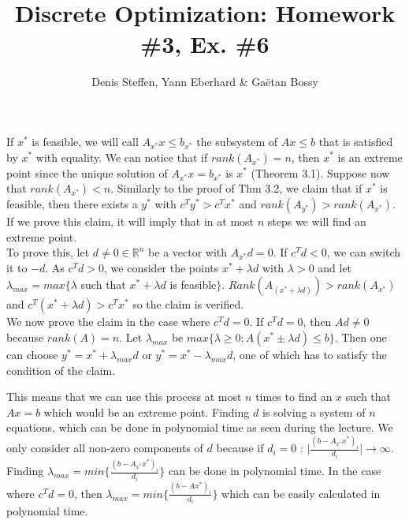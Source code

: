 \documentclass[a4paper,11pt,french]{article}
\title{Discrete Optimization: Homework \#3, Ex. \#6}
\author{Denis Steffen, Yann Eberhard \& Gaëtan Bossy}
\begin{document}
\maketitle
If $x^*$ is feasible, we will call $A_{x^*}x\leq b_{x^*}$ the subsystem of $Ax\leq b$ that is satisfied by $x^*$ with equality. 
We can notice that if $rank(A_{x^*}) = n$, then $x^*$ is an extreme point since the unique solution of $A_{x^*}x = b_{x^*}$ is $x^*$ (Theorem 3.1).
Suppose now that $rank(A_{x^*}) < n$. Similarly to the proof of Thm 3.2, we claim that if $x^*$ is feasible, then there exists a $y^*$ with $c^T y^* > c^T x^*$ and $rank(A_{y^*}) > rank(A_{x^*})$. If we prove this claim, it will imply that in at most $n$ steps we will find an extreme point.\\
To prove this, let $d \not= 0 \in \mathbb{R}^n$ be a vector with $A_{x^*}d = 0$. If $c^T d < 0$, we can switch it to $-d$. As $c^T d > 0$, we consider the points $x^* + \lambda d$ with $\lambda> 0$ and let $\lambda_{max}=max\{\lambda$ such that $x^* + \lambda d$ is feasible$\}$. 
$Rank(A_{(x^*+\lambda d)})>rank(A_{x^*})$ and $c^T(x^*+\lambda d)>c^Tx^*$ so the claim is verified. \\
We now prove the claim in the case where $c^T d = 0$. If $c^Td=0$, then $Ad \not= 0$ because $rank(A) = n$. 
Let $\lambda_{max}$ be $max\{\lambda \geq 0: A(x^*\pm\lambda d) \leq b\}$. Then one can choose $y^* = x^* + \lambda_{max}d$ or
$y^* = x^* - \lambda_{max}d$, one of which has to satisfy the condition of the claim. 

This means that we can use this process at most $n$ times to find an $x$ such that $Ax=b$ which would be an extreme point.
Finding $d$ is solving a system of $n$ equations, which can be done in polynomial time as seen during the lecture. 
We only consider all non-zero components of $d$ because if $d_i = 0$ : $\mid\frac{(b-A_{x^*}x^*)_i}{d_i}\mid \longrightarrow \infty$.
Finding $\lambda_{max} = min\{\frac{(b-A_{x^*}x^*)_i}{d_i}\}$ can be done in polynomial time. In the case where $c^Td=0$, then $\lambda_{max}=min\{\frac{(b-Ax^*)_i}{d_i}\}$ which can be easily calculated in polynomial time.
\end{document}
